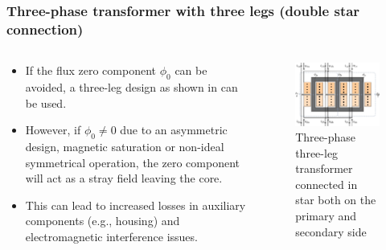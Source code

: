 \begin{frame}
	\frametitle{Three-phase transformer with three legs (double star connection)}
	\begin{columns}
		\begin{column}{0.4\textwidth}
           \begin{itemize}
				\item If the flux zero component $\phi_0$ can be avoided, a three-leg design as shown in  can be used. \pause
				\item However, if $\phi_0 \neq 0$ due to an asymmetric design, magnetic saturation or non-ideal symmetrical operation, the zero component will act as a stray field leaving the core. \pause
				\item This can lead to increased losses in auxiliary components (e.g., housing) and electromagnetic interference issues.
			\end{itemize}
		\end{column}
        \hfill
		\begin{column}{0.6\textwidth}
			\onslide<1->
			\begin{figure}
				\includegraphics[height=0.7\textheight]{fig/lec04/Three_phase_transformer_3_legs_star.pdf}
				\caption{Three-phase three-leg transformer connected in star both on the primary and secondary side}
				\label{fig:Three_phase_transformer_3_legs_star}
			\end{figure}
		\end{column}
	\end{columns}
\end{frame}

